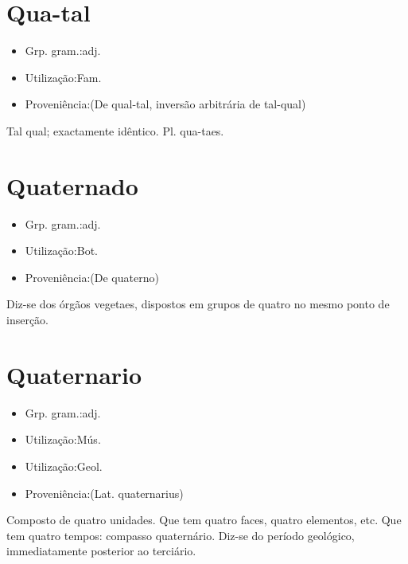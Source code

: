 \section{Qua-tal}
\begin{itemize}
\item {Grp. gram.:adj.}
\end{itemize}
\begin{itemize}
\item {Utilização:Fam.}
\end{itemize}
\begin{itemize}
\item {Proveniência:(De \textunderscore qual-tal\textunderscore , inversão arbitrária de \textunderscore tal-qual\textunderscore )}
\end{itemize}
Tal qual; exactamente idêntico.
Pl. \textunderscore qua-taes\textunderscore .
\section{Quaternado}
\begin{itemize}
\item {Grp. gram.:adj.}
\end{itemize}
\begin{itemize}
\item {Utilização:Bot.}
\end{itemize}
\begin{itemize}
\item {Proveniência:(De \textunderscore quaterno\textunderscore )}
\end{itemize}
Diz-se dos órgãos vegetaes, dispostos em grupos de quatro no mesmo ponto de inserção.
\section{Quaternario}
\begin{itemize}
\item {Grp. gram.:adj.}
\end{itemize}
\begin{itemize}
\item {Utilização:Mús.}
\end{itemize}
\begin{itemize}
\item {Utilização:Geol.}
\end{itemize}
\begin{itemize}
\item {Proveniência:(Lat. \textunderscore quaternarius\textunderscore )}
\end{itemize}
Composto de quatro unidades.
Que tem quatro faces, quatro elementos, etc.
Que tem quatro tempos: \textunderscore compasso quaternário\textunderscore .
Diz-se do período geológico, immediatamente posterior ao terciário.
